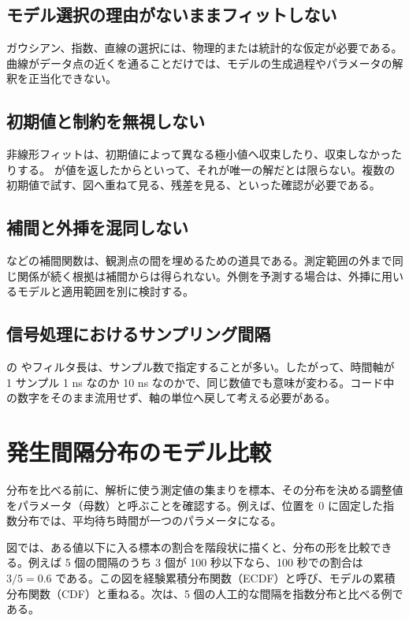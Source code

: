 \subsection{モデル選択の理由がないままフィットしない}

ガウシアン、指数、直線の選択には、物理的または統計的な仮定が必要である。曲線がデータ点の近くを通ることだけでは、モデルの生成過程やパラメータの解釈を正当化できない。

\subsection{初期値と制約を無視しない}

非線形フィットは、初期値によって異なる極小値へ収束したり、収束しなかったりする。 が値を返したからといって、それが唯一の解だとは限らない。複数の初期値で試す、図へ重ねて見る、残差を見る、といった確認が必要である。

\subsection{補間と外挿を混同しない}

 などの補間関数は、観測点の間を埋めるための道具である。測定範囲の外まで同じ関係が続く根拠は補間からは得られない。外側を予測する場合は、外挿に用いるモデルと適用範囲を別に検討する。

\subsection{信号処理におけるサンプリング間隔}

 の  やフィルタ長は、サンプル数で指定することが多い。したがって、時間軸が 1 サンプル 1 ns なのか 10 ns なのかで、同じ数値でも意味が変わる。コード中の数字をそのまま流用せず、軸の単位へ戻して考える必要がある。

\section{発生間隔分布のモデル比較}

分布を比べる前に、解析に使う測定値の集まりを標本、その分布を決める調整値をパラメータ（母数）と呼ぶことを確認する。例えば、位置を 0 に固定した指数分布では、平均待ち時間が一つのパラメータになる。

図では、ある値以下に入る標本の割合を階段状に描くと、分布の形を比較できる。例えば 5 個の間隔のうち 3 個が 100 秒以下なら、100 秒での割合は \(3/5=0.6\) である。この図を経験累積分布関数（ECDF）と呼び、モデルの累積分布関数（CDF）と重ねる。次は、5 個の人工的な間隔を指数分布と比べる例である。

